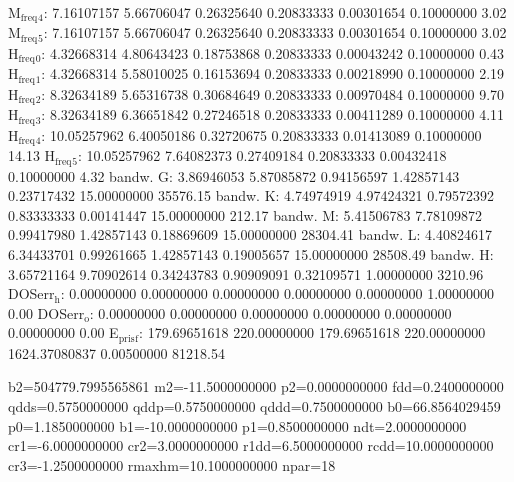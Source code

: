 \documentclass[11pt]{article}
\begin{document}
M\(_{\text{freq}}\)\(_{\text{4}}\):   7.16107157   5.66706047   0.26325640   0.20833333   0.00301654   0.10000000         3.02
M\(_{\text{freq}}\)\(_{\text{5}}\):   7.16107157   5.66706047   0.26325640   0.20833333   0.00301654   0.10000000         3.02
H\(_{\text{freq}}\)\(_{\text{0}}\):   4.32668314   4.80643423   0.18753868   0.20833333   0.00043242   0.10000000         0.43
H\(_{\text{freq}}\)\(_{\text{1}}\):   4.32668314   5.58010025   0.16153694   0.20833333   0.00218990   0.10000000         2.19
H\(_{\text{freq}}\)\(_{\text{2}}\):   8.32634189   5.65316738   0.30684649   0.20833333   0.00970484   0.10000000         9.70
H\(_{\text{freq}}\)\(_{\text{3}}\):   8.32634189   6.36651842   0.27246518   0.20833333   0.00411289   0.10000000         4.11
H\(_{\text{freq}}\)\(_{\text{4}}\):  10.05257962   6.40050186   0.32720675   0.20833333   0.01413089   0.10000000        14.13
H\(_{\text{freq}}\)\(_{\text{5}}\):  10.05257962   7.64082373   0.27409184   0.20833333   0.00432418   0.10000000         4.32
bandw. G:   3.86946053   5.87085872   0.94156597   1.42857143   0.23717432  15.00000000     35576.15
bandw. K:   4.74974919   4.97424321   0.79572392   0.83333333   0.00141447  15.00000000       212.17
bandw. M:   5.41506783   7.78109872   0.99417980   1.42857143   0.18869609  15.00000000     28304.41
bandw. L:   4.40824617   6.34433701   0.99261665   1.42857143   0.19005657  15.00000000     28508.49
bandw. H:   3.65721164   9.70902614   0.34243783   0.90909091   0.32109571   1.00000000      3210.96
DOSerr\(_{\text{h}}\):   0.00000000   0.00000000   0.00000000   0.00000000   0.00000000   1.00000000         0.00
DOSerr\(_{\text{o}}\):   0.00000000   0.00000000   0.00000000   0.00000000   0.00000000   0.00000000         0.00
E\(_{\text{pris}}\)\(_{\text{f}}\): 179.69651618 220.00000000 179.69651618 220.00000000 1624.37080837   0.00500000     81218.54


b2=504779.7995565861 m2=-11.5000000000 p2=0.0000000000 fdd=0.2400000000 qdds=0.5750000000 qddp=0.5750000000 qddd=0.7500000000 b0=66.8564029459 p0=1.1850000000 b1=-10.0000000000 p1=0.8500000000 ndt=2.0000000000 cr1=-6.0000000000 cr2=3.0000000000 r1dd=6.5000000000 rcdd=10.0000000000 cr3=-1.2500000000 rmaxhm=10.1000000000 npar=18 
\end{document}
